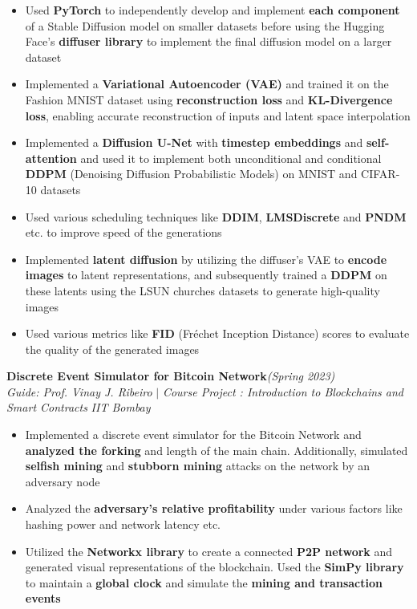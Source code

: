 \documentclass[a4paper,10pt]{article}
\begin{document}
\begin{itemize}[itemsep = -0.65 mm, leftmargin=*]
    \item Used \textbf{PyTorch} to independently develop and implement \textbf{each component} of a Stable Diffusion model on smaller datasets before using the Hugging Face's \textbf{diffuser library} to implement the final diffusion model on a larger dataset
    \item Implemented a \textbf{Variational Autoencoder (VAE)} and trained it on the Fashion MNIST dataset using \textbf{reconstruction loss} and \textbf{KL-Divergence loss}, enabling accurate reconstruction of inputs and latent space interpolation
    \item Implemented a \textbf{Diffusion U-Net} with \textbf{timestep embeddings} and \textbf{self-attention} and used it to implement both unconditional and conditional \textbf{DDPM} (Denoising Diffusion Probabilistic Models) on MNIST and CIFAR-10 datasets 
    \item Used various scheduling techniques like \textbf{DDIM}, \textbf{LMSDiscrete} and \textbf{PNDM} etc. to improve speed of the generations
    \item Implemented \textbf{latent diffusion} by utilizing the diffuser's VAE to \textbf{encode images} to latent representations, and subsequently trained a \textbf{DDPM} on these latents using the LSUN churches datasets to generate high-quality images
    \item Used various metrics like \textbf{FID} (Fréchet Inception Distance) scores to evaluate the quality of the generated images
\end{itemize}
\vspace{\baselineskip}
\vspace{-15pt}
\noindent\textbf{\large Discrete Event Simulator for Bitcoin Network}\hfill{\sl \small (Spring 2023)}\\
{\it Guide: Prof. Vinay J. Ribeiro} $|$ {\it Course Project : Introduction to Blockchains and Smart Contracts } \hfill{\it IIT Bombay}\\
\vspace{-15pt}
\begin{itemize}[itemsep = -0.65 mm, leftmargin=*]
    \item Implemented a discrete event simulator for the Bitcoin Network and \textbf{analyzed the forking} and length of the main chain. Additionally, simulated \textbf{selfish mining} and \textbf{stubborn mining} attacks on the network by an adversary node 
    \item Analyzed the \textbf{adversary's relative profitability} under various factors like hashing power and network latency etc.
    \item Utilized the \textbf{Networkx library} to create a connected \textbf{P2P network} and generated visual representations of the blockchain. Used the \textbf{SimPy library} to maintain a \textbf{global clock} and simulate the \textbf{mining and transaction events}
\end{itemize}
\end{document}
